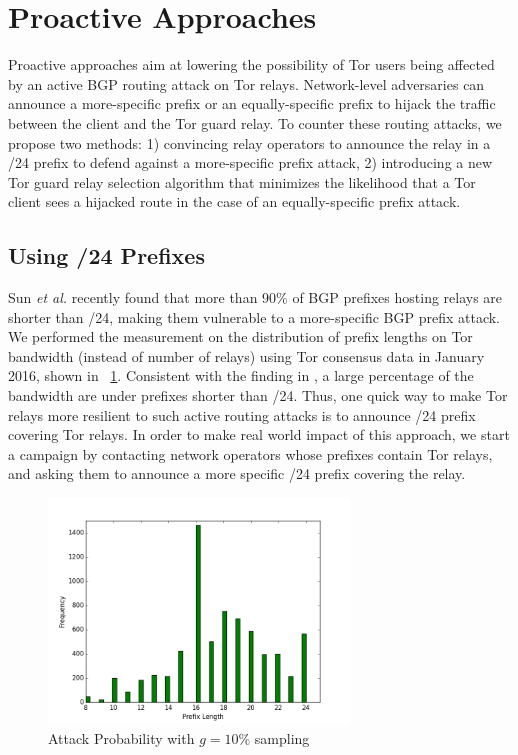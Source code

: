 \section{Proactive Approaches}
Proactive approaches aim at lowering the possibility of Tor users being affected by an active BGP routing attack on Tor relays. Network-level adversaries can announce a more-specific prefix or an equally-specific prefix to hijack the traffic between the client and the Tor guard relay. To counter these routing attacks, we propose two methods: 1) convincing relay operators to announce the relay in a /24 prefix to defend against a more-specific prefix attack, 2) introducing a new Tor guard relay selection algorithm that minimizes the likelihood that a Tor client sees a hijacked route in the case of an equally-specific prefix attack.

\subsection{Using /24 Prefixes}
\label{subsec:24prefix}

Sun \emph{et al.} \cite{sun2015raptor} recently found that more than 90\% of BGP prefixes hosting relays are
shorter than /24, making them vulnerable to a more-specific BGP prefix attack. We performed the measurement on the distribution of prefix lengths on Tor bandwidth (instead of number of relays) using Tor consensus data in January 2016, shown in ~\ref{fig_prefixlen}. Consistent with the finding in \cite{sun2015raptor}, a large percentage of the bandwidth are under prefixes shorter than /24. Thus, one quick way to make Tor relays more resilient to such active routing attacks is to announce /24 prefix covering Tor relays. In order to make real world impact of this approach, we start a campaign by contacting network operators whose prefixes contain Tor relays, and asking them to announce a more specific /24 prefix covering the relay. 

\begin{figure}[ht!]
\centering
\includegraphics[width=80mm]{prefix_len_graph}
\caption{Attack Probability with $g=10\%$ sampling \label{fig_prefixlen}}
\end{figure}

